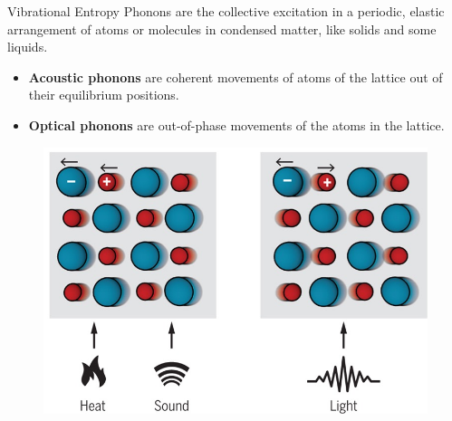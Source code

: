 \documentclass[aspectratio=169]{beamer}
\begin{document}
    \begin{frame}{Vibrational Entropy}
        Phonons are the collective excitation in a periodic, elastic arrangement of atoms or molecules in condensed matter, like solids and some liquids.
        \begin{itemize}
            \item \textbf{Acoustic phonons} are coherent movements of atoms of the lattice out of their equilibrium positions.
            \item \textbf{Optical phonons} are out-of-phase movements of the atoms in the lattice.
        \end{itemize}

        \begin{figure}
            \centering
            \includegraphics[width=0.4\linewidth]{lectures/figures/10_Phonons.jpeg}
        \end{figure}

    \end{frame}
\end{document}

